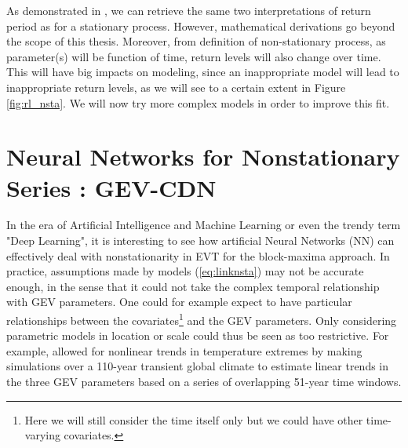 As demonstrated in \citet[Section 4.2]{ag_extremes_2013}, we can retrieve the same two interpretations of return period as for a stationary process. However, mathematical derivations go beyond the scope of this thesis. Moreover, from definition of non-stationary process, as parameter(s) will be function of time, return levels will also change over time. This will have big impacts on modeling, since an inappropriate model will lead to inappropriate return levels, as we will see to a certain extent in Figure \ref{fig:rl_nsta}. 
We will now try more complex models in order to improve this fit. 


\section{Neural Networks for Nonstationary Series : GEV-CDN}\label{sec:gevcdn}

In the era of Artificial Intelligence and Machine Learning or even the trendy term "Deep Learning", it is interesting to see how artificial Neural Networks (NN) can effectively deal with nonstationarity in EVT for the block-maxima approach. 
In practice, assumptions made by models (\ref{eq:linknsta}) may not be accurate enough, in the sense that it could not take the complex temporal relationship with GEV parameters. One could for example expect to have particular relationships between the covariates\footnote{Here we will still consider the time itself only but we could have other time-varying covariates.} and the GEV parameters. Only considering parametric models in location or scale could thus be seen as too restrictive. For example, \citet{kharin_estimating_2005} allowed for nonlinear trends in temperature extremes by making simulations over a 110-year transient global climate to estimate linear trends in the three GEV parameters based on a series of overlapping 51-year time windows. 

